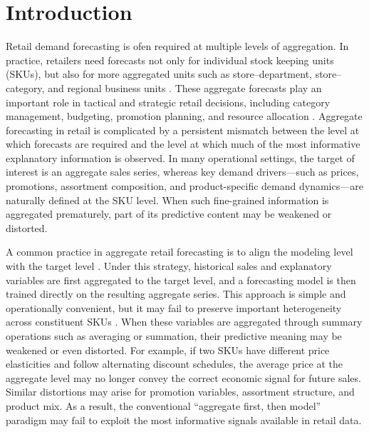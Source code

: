 \documentclass[12pt]{article}
\begin{document}
\newpage
\clearpage
{}
\setcounter{page}{1}

\section{Introduction}

Retail demand forecasting is ofen required at multiple levels of aggregation. In practice, retailers need forecasts not only for individual stock keeping units (SKUs), but also for more aggregated units such as store–department, store–category, and regional business units \parencite{fildes2022retail}. These aggregate forecasts play an important role in tactical and strategic retail decisions, including category management, budgeting, promotion planning, and resource allocation \parencite{Fisher2018UsingDataBigData}. Aggregate forecasting in retail is complicated by a persistent mismatch between the level at which forecasts are required and the level at which much of the most informative explanatory information is observed. In many operational settings, the target of interest is an aggregate sales series, whereas key demand drivers—such as prices, promotions, assortment composition, and product-specific demand dynamics—are naturally defined at the SKU level. When such fine-grained information is aggregated prematurely, part of its predictive content may be weakened or distorted.

A common practice in aggregate retail forecasting is to align the modeling level with the target level \parencite{fildes2022retail}. Under this strategy, historical sales and explanatory variables are first aggregated to the target level, and a forecasting model is then trained directly on the resulting aggregate series. This approach is simple and operationally convenient, but it may fail to preserve important heterogeneity across constituent SKUs \parencite{MA2017680}. When these variables are aggregated through summary operations such as averaging or summation, their predictive meaning may be weakened or even distorted. For example, if two SKUs have different price elasticities and follow alternating discount schedules, the average price at the aggregate level may no longer convey the correct economic signal for future sales. Similar distortions may arise for promotion variables, assortment structure, and product mix. As a result, the conventional ``aggregate first, then model'' paradigm may fail to exploit the most informative signals available in retail data.
\end{document}

